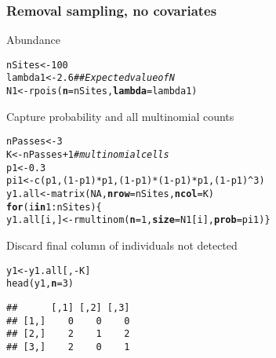 \documentclass[color=usenames,dvipsnames]{beamer}\usepackage[]{graphicx}\usepackage[]{color}
\makeatletter
\newcommand{\hlnum}[1]{\textcolor[rgb]{0.69,0.494,0}{#1}}%
\newcommand{\hlcom}[1]{\textcolor[rgb]{0.514,0.506,0.514}{\textit{#1}}}%
\newcommand{\hlopt}[1]{\textcolor[rgb]{0,0,0}{#1}}%
\newcommand{\hlstd}[1]{\textcolor[rgb]{0,0,0}{#1}}%
\newcommand{\hlkwa}[1]{\textcolor[rgb]{0,0,0}{\textbf{#1}}}%
\newcommand{\hlkwb}[1]{\textcolor[rgb]{0,0.341,0.682}{#1}}%
\newcommand{\hlkwc}[1]{\textcolor[rgb]{0,0,0}{\textbf{#1}}}%
\newcommand{\hlkwd}[1]{\textcolor[rgb]{0.004,0.004,0.506}{#1}}%
\newenvironment{kframe}{%
 \def\at@end@of@kframe{}%
 \ifinner\ifhmode%
  \def\at@end@of@kframe{\end{minipage}}%
  \begin{minipage}{\columnwidth}%
 \fi\fi%
 \def\FrameCommand##1{\hskip\@totalleftmargin \hskip-\fboxsep
 \colorbox{shadecolor}{##1}\hskip-\fboxsep
     \hskip-\linewidth \hskip-\@totalleftmargin \hskip\columnwidth}%
 \MakeFramed {\advance\hsize-\width
   \@totalleftmargin\z@ \linewidth\hsize
   \@setminipage}}%
 {\par\unskip\endMakeFramed%
 \at@end@of@kframe}
\newenvironment{knitrout}{}{} %
\makeatother
\begin{document}
\begin{frame}[fragile]
  \frametitle{Removal sampling, no covariates}
  \small
  Abundance
\begin{knitrout}\scriptsize
{}\color{fgcolor}\begin{kframe}
\begin{alltt}
\hlstd{nSites} \hlkwb{<-} \hlnum{100}
\hlstd{lambda1} \hlkwb{<-} \hlnum{2.6}  \hlcom{## Expected value of N}
\hlstd{N1} \hlkwb{<-} \hlkwd{rpois}\hlstd{(}\hlkwc{n}\hlstd{=nSites,} \hlkwc{lambda}\hlstd{=lambda1)}
\end{alltt}
\end{kframe}
\end{knitrout}
  \pause
  \vfill
  Capture probability and \alert{all} multinomial counts
\begin{knitrout}\scriptsize
{}\color{fgcolor}\begin{kframe}
\begin{alltt}
\hlstd{nPasses} \hlkwb{<-} \hlnum{3}
\hlstd{K} \hlkwb{<-} \hlstd{nPasses}\hlopt{+}\hlnum{1}  \hlcom{# multinomial cells}
\hlstd{p1} \hlkwb{<-} \hlnum{0.3}
\hlstd{pi1} \hlkwb{<-} \hlkwd{c}\hlstd{(p1, (}\hlnum{1}\hlopt{-}\hlstd{p1)}\hlopt{*}\hlstd{p1, (}\hlnum{1}\hlopt{-}\hlstd{p1)}\hlopt{*}\hlstd{(}\hlnum{1}\hlopt{-}\hlstd{p1)}\hlopt{*}\hlstd{p1, (}\hlnum{1}\hlopt{-}\hlstd{p1)}\hlopt{^}\hlnum{3}\hlstd{)}
\hlstd{y1.all} \hlkwb{<-} \hlkwd{matrix}\hlstd{(}\hlnum{NA}\hlstd{,} \hlkwc{nrow}\hlstd{=nSites,} \hlkwc{ncol}\hlstd{=K)}
\hlkwa{for}\hlstd{(i} \hlkwa{in} \hlnum{1}\hlopt{:}\hlstd{nSites) \{}
    \hlstd{y1.all[i,]} \hlkwb{<-} \hlkwd{rmultinom}\hlstd{(}\hlkwc{n}\hlstd{=}\hlnum{1}\hlstd{,} \hlkwc{size}\hlstd{=N1[i],} \hlkwc{prob}\hlstd{=pi1)    \}}
\end{alltt}
\end{kframe}
\end{knitrout}
  \pause
  \vfill
  Discard final column of individuals not detected
\begin{knitrout}\scriptsize
{}\color{fgcolor}\begin{kframe}
\begin{alltt}
\hlstd{y1} \hlkwb{<-} \hlstd{y1.all[,}\hlopt{-}\hlstd{K]}
\hlkwd{head}\hlstd{(y1,} \hlkwc{n}\hlstd{=}\hlnum{3}\hlstd{)}
\end{alltt}
\begin{verbatim}
##      [,1] [,2] [,3]
## [1,]    0    0    0
## [2,]    2    1    2
## [3,]    2    0    1
\end{verbatim}
\end{kframe}
\end{knitrout}
\end{frame}
\end{document}
